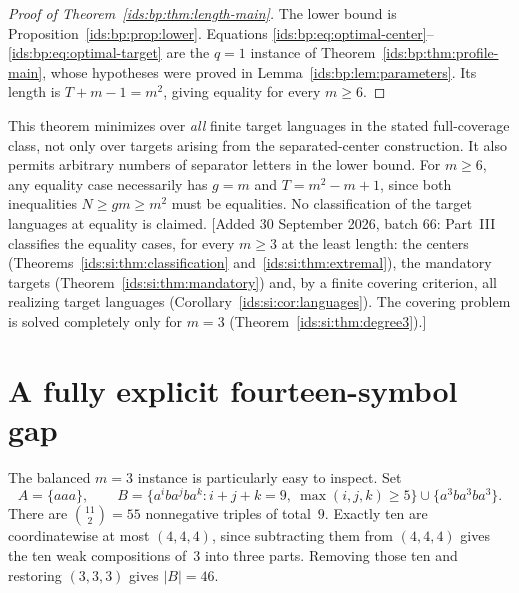 \documentclass[11pt,letterpaper]{article}
\theoremstyle{definition}\newtheorem{definition}[theorem]{Definition}
\theoremstyle{remark}\newtheorem{remark}[theorem]{Remark}
\theoremstyle{definition}\newtheorem{question}[theorem]{Question}
\begin{document}
\begin{proof}[Proof of Theorem~\ref{ids:bp:thm:length-main}]
The lower bound is Proposition~\ref{ids:bp:prop:lower}. Equations
\eqref{ids:bp:eq:optimal-center}--\eqref{ids:bp:eq:optimal-target} are the
$q=1$ instance of Theorem~\ref{ids:bp:thm:profile-main}, whose hypotheses were
proved in Lemma~\ref{ids:bp:lem:parameters}. Its length is
$T+m-1=m^2$, giving equality for every $m\geq6$.
\end{proof}

This theorem minimizes over \emph{all} finite target languages in the stated
full-coverage class, not only over targets arising from the separated-center
construction. It also permits arbitrary numbers of separator letters in the
lower bound. For $m\geq6$, any equality case necessarily has $g=m$ and
$T=m^2-m+1$, since both inequalities $N\geq gm\geq m^2$ must be equalities.
No classification of the target languages at equality is claimed.
[Added 30 September 2026, batch 66: Part~III classifies the equality cases,
for every $m\geq3$ at the least length: the centers
(Theorems~\ref{ids:si:thm:classification} and~\ref{ids:si:thm:extremal}),
the mandatory targets (Theorem~\ref{ids:si:thm:mandatory}) and, by a finite
covering criterion, all realizing target languages
(Corollary~\ref{ids:si:cor:languages}). The covering problem is solved
completely only for $m=3$ (Theorem~\ref{ids:si:thm:degree3}).]

\section{A fully explicit fourteen-symbol gap}
\label{ids:bp:sec:example}

The balanced $m=3$ instance is particularly easy to inspect. Set
\begin{equation}
 A=\{aaa\},\qquad
 B=\{a^ib a^jb a^k:i+j+k=9,\ \max(i,j,k)\geq5\}
        \cup\{a^3ba^3ba^3\}.
 \label{ids:bp:eq:worked}
\end{equation}
There are $\binom{11}{2}=55$ nonnegative triples of total~$9$. Exactly ten
are coordinatewise at most $(4,4,4)$, since subtracting them from $(4,4,4)$
gives the ten weak compositions of~$3$ into three parts. Removing those ten
and restoring $(3,3,3)$ gives $|B|=46$.
\end{document}
